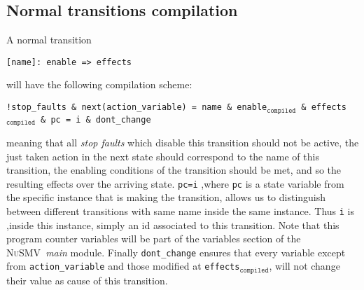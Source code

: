 \documentclass{llncs2e/llncs}
\newcommand{\nusmvSp}{\mbox{\textsc{NuSMV~}}}
\newcommand{\undtt}[1]{$_{\texttt{#1}}$}                %
\newcommand{\undfll}[1]{\undtt{#1}}                     %
\newcommand{\textfll}[1]{\texttt{#1}}                   %
\begin{document}
\subsection{Normal transitions compilation}
A normal transition
\begin{center}
\textfll{[name]: enable => effects}
\end{center}
will have the following compilation scheme:
\begin{center}
\textfll{!stop\_faults \& next(action\_variable) = name \& enable\undfll{compiled} \& effects\undfll{compiled} \& pc = i \& dont\_change}
\end{center}
meaning that all \textit{stop faults} which disable this transition should not be active, the just taken action in the next state should correspond to the name of this transition, the enabling conditions of the transition should be met, and so the resulting effects over the arriving state. \textfll{pc=i} ,where \textfll{pc} is a state variable from the specific instance that is making the transition, allows us to distinguish between different transitions with same name inside the same instance. Thus \textfll{i} is ,inside this instance, simply an id associated to this transition. Note that this program counter variables will be part of the variables section of the \nusmvSp \textit{main} module. Finally \textfll{dont\_change} ensures that every variable except from \textfll{action\_variable} and those modified at \textfll{effects\undfll{compiled}}, will not change their value as cause of this transition.
\end{document}
